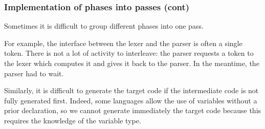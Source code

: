 % 
\begin{frame}
\frametitle{Implementation of phases into passes (cont)}

Sometimes it is difficult to group different phases into one pass.

\bigskip

For example, the interface between the lexer and the parser is often a
single token. There is not a lot of activity to interleave: the
parser requests a token to the lexer which computes it and gives it
back to the parser. In the meantime, the parser had to wait.

\bigskip

Similarly, it is difficult to generate the target code if the
intermediate code is not fully generated first. Indeed, some languages
allow the use of variables without a prior declaration, so we cannot
generate immediately the target code because this requires the
knowledge of the variable type.

\end{frame}
